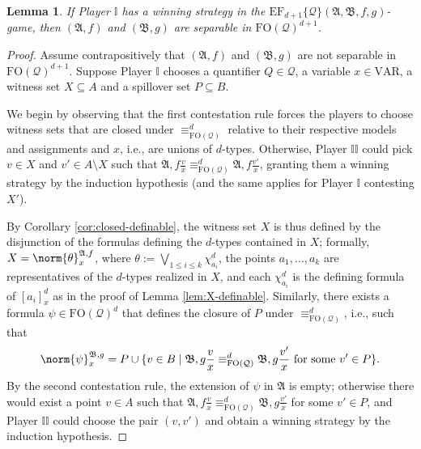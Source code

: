 \documentclass{article}
\newtheorem{lemma}[theorem]{Lemma}
\theoremstyle{definition}
\begin{document}
\begin{lemma}\label{lem:game-implies-equivalence}
    If Player $\mathbb{I}$ has a winning strategy in the $\mathrm{EF}_{d+1}\{\mathcal{Q}\}(\mathfrak{A},\mathfrak{B},f,g)$-game, then $(\mathfrak{A},f)$ and $(\mathfrak{B},g)$ are separable in $\mathrm{FO}(\mathcal{Q})^{d+1}$.
\end{lemma}
\begin{proof}
    Assume contrapositively that $(\mathfrak{A},f)$ and $(\mathfrak{B},g)$ are not separable in $\mathrm{FO}(\mathcal{Q})^{d+1}$. Suppose Player $\mathbb{I}$ chooses a quantifier $Q\in\mathcal{Q}$, a variable $x\in\mathrm{VAR}$, a witness set $X\subseteq A$ and a spillover set $P\subseteq B$.
    
    We begin by observing that the first contestation rule forces the players to choose witness sets that are closed under $\equiv^d_{\mathrm{FO}(\mathcal{Q})}$ relative to their respective models and assignments and $x$, i.e., are unions of $d$-types. Otherwise, Player $\mathbb{II}$ could pick $v\in X$ and $v'\in A\setminus X$ such that $\mathfrak{A},f\frac{v}{x}\equiv^d_{\mathrm{FO}(\mathcal{Q})} \mathfrak{A},f\frac{v'}{x}$, granting them a winning strategy by the induction hypothesis (and the same applies for Player $\mathbb{I}$ contesting $X'$).

    By Corollary \ref{cor:closed-definable}, the witness set $X$ is thus defined by the disjunction of the formulas defining the $d$-types contained in $X$; formally, $X=\norm{\theta}^{\mathfrak{A},f}_x$, where $\theta:=\bigvee_{1\leq i\leq k}\chi_{a_i}^d$, the points $a_1,\dots,a_k$ are representatives of the $d$-types realized in $X$, and each $\chi^d_{a_i}$ is the defining formula of $[a_i]^d_x$ as in the proof of Lemma \ref{lem:X-definable}. Similarly, there exists a formula $\psi\in\mathrm{FO}(\mathcal{Q})^d$ that defines the closure of $P$ under $\equiv^d_{\mathrm{FO}(\mathcal{Q})}$, i.e., such that
    \[
        \norm{\psi}^{\mathfrak{B},g}_x=P\cup\{v\in B\mid
        \mathfrak{B},g\frac{v}{x}\equiv^d_{\mathrm{FO}(\mathcal{Q})}
        \mathfrak{B},g\frac{v'}{x}\text{ for some }v'\in P\}.
    \]
    By the second contestation rule, the extension of $\psi$ in $\mathfrak{A}$ is empty; otherwise there would exist a point $v\in A$ such that $\mathfrak{A},f\frac{v}{x}\equiv^d_{\mathrm{FO}(\mathcal{Q})} \mathfrak{B},g\frac{v'}{x}$ for some $v'\in P$, and Player $\mathbb{II}$ could choose the pair $(v,v')$ and obtain a winning strategy by the induction hypothesis.
    

\end{proof}
\end{document}
